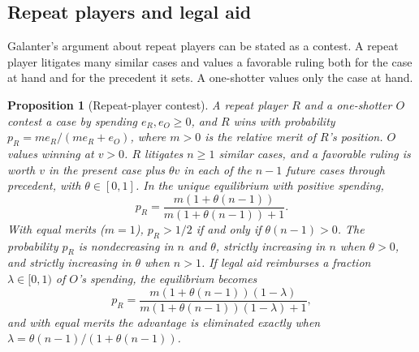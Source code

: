 \documentclass[11pt,letterpaper]{article}
\newtheorem{proposition}[theorem]{Proposition}
\theoremstyle{definition}
\theoremstyle{remark}
\begin{document}
\subsection{Repeat players and legal aid}

Galanter's argument about repeat players can be stated as a contest. A repeat player litigates many similar cases and values a favorable ruling both for the case at hand and for the precedent it sets. A one-shotter values only the case at hand.

\begin{proposition}[Repeat-player contest]
\label{prop:judicial-power:repeat}
A repeat player $R$ and a one-shotter $O$ contest a case by spending $e_R,e_O\ge 0$, and $R$ wins with probability $p_R=me_R/(me_R+e_O)$, where $m>0$ is the relative merit of $R$'s position. $O$ values winning at $v>0$. $R$ litigates $n\ge 1$ similar cases, and a favorable ruling is worth $v$ in the present case plus $\theta v$ in each of the $n-1$ future cases through precedent, with $\theta\in[0,1]$. In the unique equilibrium with positive spending,
\[
p_R=\frac{m(1+\theta(n-1))}{m(1+\theta(n-1))+1}.
\]
With equal merits ($m=1$), $p_R>1/2$ if and only if $\theta(n-1)>0$. The probability $p_R$ is nondecreasing in $n$ and $\theta$, strictly increasing in $n$ when $\theta>0$, and strictly increasing in $\theta$ when $n>1$. If legal aid reimburses a fraction $\lambda\in[0,1)$ of $O$'s spending, the equilibrium becomes
\[
p_R=\frac{m(1+\theta(n-1))(1-\lambda)}{m(1+\theta(n-1))(1-\lambda)+1},
\]
and with equal merits the advantage is eliminated exactly when $\lambda=\theta(n-1)/(1+\theta(n-1))$.
\end{proposition}
\end{document}
